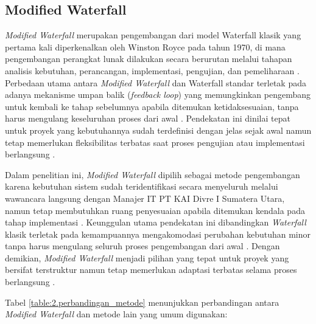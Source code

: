 \subsection{Modified Waterfall} \label{II.ModifiedWaterfall}
\textit{Modified Waterfall} merupakan pengembangan dari model Waterfall klasik yang pertama kali diperkenalkan oleh Winston Royce pada tahun 1970, di mana pengembangan perangkat lunak dilakukan secara berurutan melalui tahapan analisis kebutuhan, perancangan, implementasi, pengujian, dan pemeliharaan \cite{ningsih2023perbandingan}. Perbedaan utama antara \textit{Modified Waterfall} dan Waterfall standar terletak pada adanya mekanisme umpan balik (\textit{feedback loop}) yang memungkinkan pengembang untuk kembali ke tahap sebelumnya apabila ditemukan ketidaksesuaian, tanpa harus mengulang keseluruhan proses dari awal \cite{ningsih2023perbandingan}. Pendekatan ini dinilai tepat untuk proyek yang kebutuhannya sudah terdefinisi dengan jelas sejak awal namun tetap memerlukan fleksibilitas terbatas saat proses pengujian atau implementasi berlangsung \cite{prasnowo2024waterfall}. \par

Dalam penelitian ini, \textit{Modified Waterfall} dipilih sebagai metode pengembangan karena kebutuhan sistem sudah teridentifikasi secara menyeluruh melalui wawancara langsung dengan Manajer IT PT KAI Divre I Sumatera Utara, namun tetap membutuhkan ruang penyesuaian apabila ditemukan kendala pada tahap implementasi \cite{prasnowo2024waterfall}. Keunggulan utama pendekatan ini dibandingkan \textit{Waterfall} klasik terletak pada kemampuannya mengakomodasi perubahan kebutuhan minor tanpa harus mengulang seluruh proses pengembangan dari awal \cite{ningsih2023perbandingan}. Dengan demikian, \textit{Modified Waterfall} menjadi pilihan yang tepat untuk proyek yang bersifat terstruktur namun tetap memerlukan adaptasi terbatas selama proses berlangsung \cite{prasnowo2024waterfall}. \par

Tabel \ref{table:2.perbandingan_metode} menunjukkan perbandingan antara \textit{Modified Waterfall} dan metode lain yang umum digunakan:

